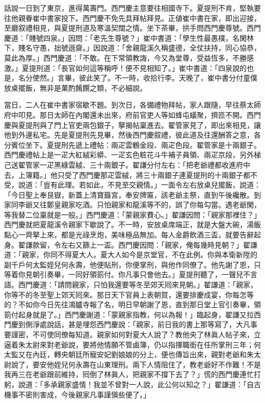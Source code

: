 話說一日到了東京，進得萬壽門。西門慶主意要往相國寺下。夏提刑不肯，堅執要往他親眷崔中書家投下。西門慶不免先具拜帖拜見。正値崔中書在家，即出迎接，至廳叙禮相見，與夏提刑道及寒溫契闊之情。坐下茶畢，拱手問西門慶尊號。西門慶道：「賤號四泉。」因問：「老先生尊號？」崔中書道：「學生性最愚樸，名閑林下，賤名守愚，拙號遜齋。」因說道：「舍親龍溪久稱盛德，全仗扶持，同心協恭，莫此為厚。」西門慶道：「不敢。在下常領教誨，今又為堂尊，受益恆多，不勝感激。」夏提刑道：「長官如何這等稱呼！便不見相知了。」崔中書道：「四泉說的也是，名分使然。」言畢，彼此笑了。不一時，收拾行李。天晚了，崔中書分付童僕放桌擺飯，無非是菓酌餚饌之類，不必細說。

當日，二人在崔中書家宿歇不題。到次日，各備禮物拜帖，家人跟隨，早往蔡太師府中叩見。那日太師在內閣還未出來，府前官吏人等如蜂屯蟻聚，擠匝不開。西門慶與夏提刑與了門上官吏兩包銀子，拏揭帖稟進去。翟管家見了，即出來相見，讓他到外邊私宅。先是夏提刑先見畢，然後西門慶叙禮，彼此道及往還酬答之意，各分賓位坐下。夏提刑先遞上禮帖：兩疋雲鶴金段、兩疋色段。翟管家是十兩銀子。西門慶禮帖上是一疋大紅絨彩蟒、一疋玄色粧花斗牛補子員領、兩疋京段，另外梯己送翟管家一疋黑綠雲絨、三十兩銀子。{}翟謙分付左右：「把老爺禮都收進府中去，上簿籍。」他只受了西門慶那疋雲絨，將三十兩銀子連夏提刑的十兩銀子都不受，說道：「豈有此理。若如此，不見至交親情。」一面令左右放桌兒擺飯，說道：「今日聖上奉艮嶽，新蓋上清寶籙宮，奉安牌匾，該老爺主祭，直到午後纔散。到家同李爺又往鄭皇親家吃酒。只怕親家和龍溪等不的，誤了你每勾當。遇老爺閑，等我替二位稟就是一般。」西門慶道：「蒙親家費心。」翟謙因問：「親家那裡住？」西門慶就把夏龍溪令親家下歇說了。不一時，安放桌席端正，就是大盤大碗，湯飯點心一齊拏上來，都是光祿烹炮，美味極品無加。每人金爵飲酒三盃，就要告辭起身。翟謙款留，令左右又篩上一盃。西門慶因問：「親家，俺每幾時見朝？」翟謙道：「親家，你同不得夏大人。夏大人如今是京堂官，不在此例。你與本衛新陞的副千戶何太監姪兒何永壽，他便貼刑，你便掌刑，與他作同僚了。他先謝了恩，只等着你見朝引奏畢，一同好領箚付。你凡事只會他去。」夏提刑聽了，一聲兒不言語。西門慶道：「請問親家，只怕我還要等冬至郊天囘來見朝。」翟謙道：「親家，你等不的冬至聖上郊天囘來。那日天下官員上表朝賀，還要排慶成宴，你每怎等的？不如你今日先往鴻臚寺報了名，明日早朝謝了恩，直到那日堂上官引奏畢，領箚付起身就是了。」西門慶謝道：「蒙親家指教，何以為報！」臨起身，翟謙又拉西門慶到側淨處說話，{}甚是埋怨西門慶說：「親家，前日我的書上那等寫了，大凡事要謹密，不可使同僚每知道。親家如何對夏大人說了？{}教他央了林眞人帖子來，立逼着朱太尉來對老爺說，{}要將他情願不管鹵簿，仍以指揮職銜在任所掌刑三年；何太監又在內廷，轉央朝廷所寵安妃劉娘娘的分上，便也傳旨出來，親對老爺和朱太尉說了，要安他姪兒何永壽在山東理刑。兩下人情阻住了，教老爺好不作難！不是我再三在老爺跟前維持，囘倒了林眞人，把親家不撐下去了？」慌的西門慶連忙打躬，說道：「多承親家盛情！我並不曾對一人說，此公何以知之？」翟謙道：「自古機事不密則害成，今後親家凡事謹愼些便了。」


